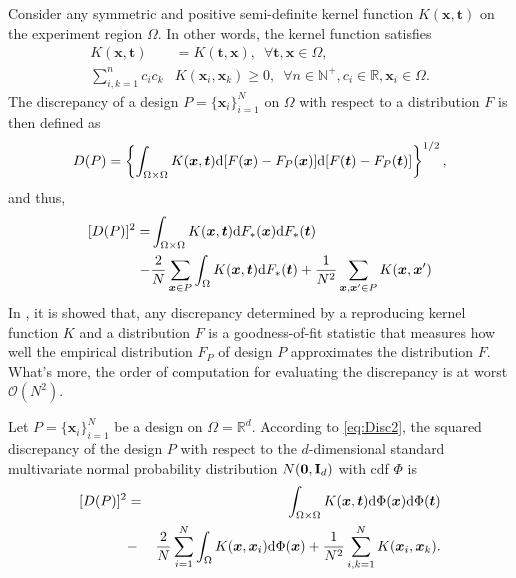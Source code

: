 \documentclass[graybox]{svmult}
\newcommand{\vx}{\boldsymbol{x}}
\newcommand{\vt}{\boldsymbol{t}}
\newcommand{\dif}{{\rm d}}
\newcommand{\Ftar}{F}
\begin{document}
Consider any symmetric and positive semi-definite kernel function $K(\vx,\vt)$ on the experiment region $\Omega$. 
In other words, the kernel function satisfies 
\begin{align*}
K(\vx, \vt) &= K(\vt, \vx), \,\,\,\forall \vt, \vx\in \Omega,\\
\sum\limits_{i, k=1}^n c_ic_k & K(\vx_i,\vx_k)\geq 0, \,\,\,\forall n\in\mathbb{N^+}, c_i\in\mathbb{R}, \vx_i\in\Omega.
\end{align*}
The discrepancy of a design $P = \{\vx_i\}_{i=1}^N$ on $\Omega$ with respect to a distribution $\Ftar$ is then defined as
\begin{equation}\label{eq:Disc}
D(P) = \left\{\int_{\Omega\times\Omega} K(\vx,\vt)\dif [\Ftar(\vx)-F_{P}(\vx)]\dif [\Ftar(\vt)-F_{P}(\vt)]\right\}^{1/2},
\end{equation}
and thus, 
\begin{align}\label{eq:Disc2}\nonumber
[D(P)]^2  =& \int_{\Omega\times\Omega}  K(\vx,\vt)\dif F_{*}(\vx)\dif F_{*}(\vt) \\
- &\frac{2}{N}\sum\limits_{\vx\in P}\int_{\Omega}K(\vx,\vt)\dif F_{*}(\vt) +\frac{1}{N^2}\sum\limits_{\vx,\vx'\in P}K(\vx,\vx')
\end{align}
In \cite{Hic99a}, it is showed that, any discrepancy determined by a reproducing kernel function $K$ and a distribution $\Ftar$ is a goodness-of-fit statistic that measures how well the empirical distribution $F_P$ of design $P$ approximates the distribution $\Ftar$. 
What's more, the order of computation for evaluating the discrepancy is at worst $\mathcal{O}(N^2)$. 

 Let $P = \{\vx_i\}_{i=1}^N$ be a design on $\Omega = \mathbb{R}^d$. 
 According to \eqref{eq:Disc2}, the squared discrepancy of the design $P$ with respect to the $d$-dimensional standard multivariate normal probability distribution $N({\bf 0}, {\bf I}_d)$ with cdf $\Phi$ is
\begin{eqnarray}\label{eqn:discrepancy}\nonumber
[D(P)]^2 &=& \int_{\Omega\times\Omega} K(\vx,\vt)\dif \Phi(\vx)\dif \Phi(\vt)\\
&-&\frac{2}{N}\sum_{i=1}^N \int_{\Omega}K(\vx,\vx_i)\dif \Phi(\vx)+\frac{1}{N^2}\sum_{i,k=1}^N K(\vx_i,\vx_k).
\end{eqnarray}
\end{document}
